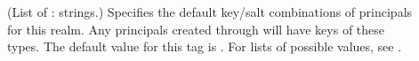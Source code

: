 \documentclass[letterpaper,10pt,english]{sphinxmanual}
\begin{document}
\begin{description}
\item[{}] \leavevmode
\sphinxAtStartPar
(List of : strings.)  Specifies the default key/salt
combinations of principals for this realm.  Any principals created
through {\hyperref[\detokenize{admin/admin_commands/kadmin_local:kadmin-1}]{}} will have keys of these types.  The
default value for this tag is .  For lists of
possible values, see {\hyperref[\detokenize{admin/conf_files/kdc_conf:keysalt-lists}]{}}.

\end{description}
\end{document}
